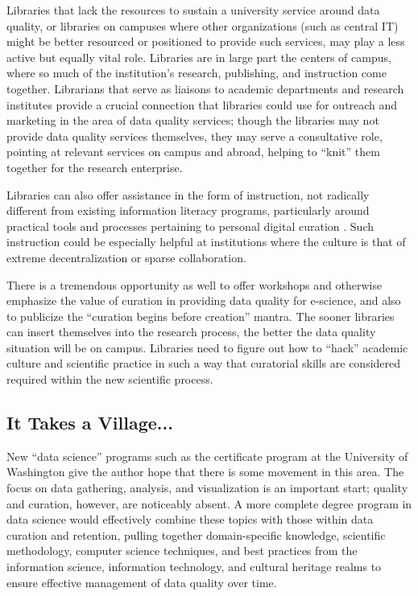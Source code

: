 \documentclass[man,12pt,biblatex]{apa6}
\begin{document}
Libraries that lack the resources to sustain a university service
around data quality, or libraries on campuses where other
organizations (such as central IT) might be better resourced or
positioned to provide such services, may play a less active but
equally vital role. Libraries are in large part the centers of campus,
where so much of the institution's research, publishing, and
instruction come together. Librarians that serve as liaisons to
academic departments and research institutes provide a crucial
connection that libraries could use for outreach and marketing in the
area of data quality services; though the libraries may not provide
data quality services themselves, they may serve a consultative role,
pointing at relevant services on campus and abroad, helping to
``knit'' them together for the research enterprise.

Libraries can also offer assistance in the form of instruction, not
radically different from existing information literacy programs,
particularly around practical tools and processes pertaining to
personal digital curation \parencite{williams:lifecycle}. Such instruction
could be especially helpful at institutions where the culture is that
of extreme decentralization or sparse collaboration.

There is a tremendous opportunity as well to offer workshops and
otherwise emphasize the value of curation in providing data quality
for e-science, and also to publicize the ``curation begins before
creation'' mantra. The sooner libraries can insert themselves into the
research process, the better the data quality situation will be on
campus. Libraries need to figure out how to ``hack'' academic culture
and scientific practice in such a way that curatorial skills are
considered required within the new scientific process.

\subsection{It Takes a Village...}

New ``data science'' programs such as the certificate program at the
University of Washington \parencite{uw:datascience} give the author hope
that there is some movement in this area. The focus on data gathering,
analysis, and visualization is an important start; quality and
curation, however, are noticeably absent. A more complete degree
program in data science would effectively combine these topics with
those within data curation and retention, pulling together
domain-specific knowledge, scientific methodology, computer science
techniques, and best practices from the information science,
information technology, and cultural heritage realms to ensure
effective management of data quality over time.
\end{document}
